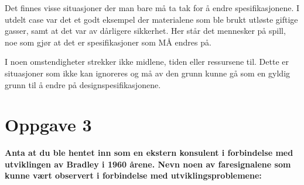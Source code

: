 		Det finnes visse situasjoner der man bare må ta tak for å endre spesifikasjonene. 
		I utdelt case var det et godt eksempel der materialene som ble brukt utløste giftige gasser, 
		samt at det var av dårligere sikkerhet. Her står det mennesker på spill, noe som gjør at
		det er spesifikasjoner som MÅ endres på. 

		I noen omstendigheter strekker ikke midlene, tiden eller ressursene til. Dette er situasjoner
		som ikke kan ignoreres og må av den grunn kunne gå som en gyldig grunn til å endre på
		designspesifikasjonene. 

\clearpage
\section*{Oppgave 3}

	{\bf Anta at du ble hentet inn som en ekstern konsulent i forbindelse med utviklingen av Bradley
	i 1960 årene. Nevn noen av faresignalene som kunne vært observert i forbindelse med utviklingsproblemene:}
	\\


